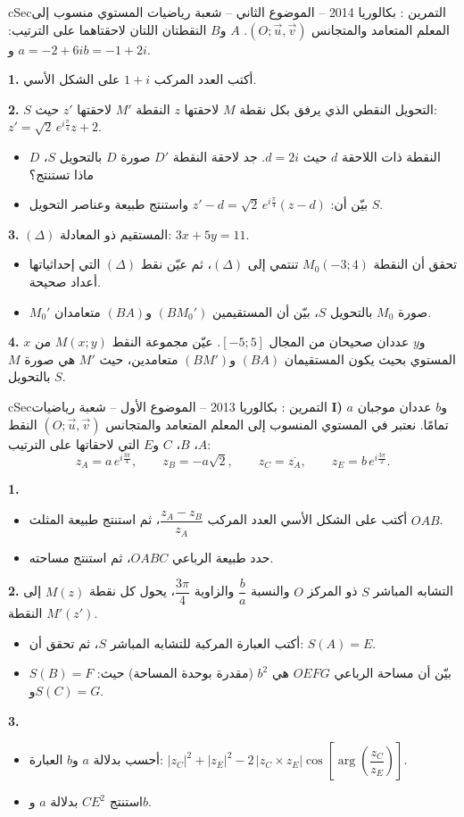 \documentclass[12pt,a4paper]{article}
\newenvironment{BOX}[2]{\begin{otherlanguage}{english}\begin{arbox}{#1}{#2}}{\end{arbox}\end{otherlanguage}}
\newcounter{exo}
\newenvironment{tamrin}[1]{\stepcounter{exo}\begin{BOX}{cSec}{التمرين \theexo: #1}}{\end{BOX}}
\newenvironment{sq}{\begin{itemize}[leftmargin=2.4em,itemsep=3pt]}{\end{itemize}}
\newcommand{\qa}{\item[(أ)]}\newcommand{\qb}{\item[(ب)]}\newcommand{\qc}{\item[(جـ)]}\newcommand{\qd}{\item[(د)]}\newcommand{\qe}{\item[(هـ)]}
\newcommand{\QQ}[1]{\par\smallskip\textbf{#1.} }
\begin{document}
\begin{tamrin}{بكالوريا 2014 -- الموضوع الثاني -- شعبة رياضيات}
المستوي منسوب إلى المعلم المتعامد والمتجانس $(O;\vec u,\vec v)$. $A$ و$B$ النقطتان اللتان لاحقتاهما على الترتيب: $a=-2+6i$ و$b=-1+2i$.
\QQ{1} أكتب العدد المركب $1+i$ على الشكل الأسي.
\QQ{2} $S$ التحويل النقطي الذي يرفق بكل نقطة $M$ لاحقتها $z$ النقطة $M'$ لاحقتها $z'$ حيث: $z'=\sqrt2\,e^{i\frac{\pi}{4}}z+2$.
\begin{sq}
\qa $D$ النقطة ذات اللاحقة $d$ حيث $d=2i$. جد لاحقة النقطة $D'$ صورة $D$ بالتحويل $S$، ماذا تستنتج؟
\qb بيّن أن: $z'-d=\sqrt2\,e^{i\frac{\pi}{4}}(z-d)$ واستنتج طبيعة وعناصر التحويل $S$.
\end{sq}
\QQ{3} $(\Delta)$ المستقيم ذو المعادلة: $3x+5y=11$.
\begin{sq}
\qa تحقق أن النقطة $M_0(-3;4)$ تنتمي إلى $(\Delta)$، ثم عيّن نقط $(\Delta)$ التي إحداثياتها أعداد صحيحة.
\qb $M_0'$ صورة $M_0$ بالتحويل $S$، بيّن أن المستقيمين $(BM_0')$ و$(BA)$ متعامدان.
\end{sq}
\QQ{4} $x$ و$y$ عددان صحيحان من المجال $[-5;5]$. عيّن مجموعة النقط $M(x;y)$ من المستوي بحيث يكون المستقيمان $(BA)$ و$(BM')$ متعامدين، حيث $M'$ هي صورة $M$ بالتحويل $S$.
\end{tamrin}

\begin{tamrin}{بكالوريا 2013 -- الموضوع الأول -- شعبة رياضيات}
\textbf{I)} $a$ و$b$ عددان موجبان تمامًا. نعتبر في المستوي المنسوب إلى المعلم المتعامد والمتجانس $(O;\vec u,\vec v)$ النقط $A$، $B$، $C$ و$E$ التي لاحقاتها على الترتيب:
\[z_A=a\,e^{i\frac{3\pi}{4}},\qquad z_B=-a\sqrt2,\qquad z_C=\overline{z_A},\qquad z_E=b\,e^{i\frac{3\pi}{2}}.\]
\QQ{1}
\begin{sq}
\qa أكتب على الشكل الأسي العدد المركب $\dfrac{z_A-z_B}{z_A}$، ثم استنتج طبيعة المثلث $OAB$.
\qb حدد طبيعة الرباعي $OABC$، ثم استنتج مساحته.
\end{sq}
\QQ{2} التشابه المباشر $S$ ذو المركز $O$ والنسبة $\dfrac{b}{a}$ والزاوية $\dfrac{3\pi}{4}$، يحول كل نقطة $M(z)$ إلى النقطة $M'(z')$.
\begin{sq}
\qa أكتب العبارة المركبة للتشابه المباشر $S$، ثم تحقق أن: $S(A)=E$.
\qb بيّن أن مساحة الرباعي $OEFG$ هي $b^2$ (مقدرة بوحدة المساحة) حيث: $S(B)=F$ و$S(C)=G$.
\end{sq}
\QQ{3}
\begin{sq}
\qa أحسب بدلالة $a$ و$b$ العبارة: $|z_C|^2+|z_E|^2-2\,|z_C\times z_E|\cos\left[\arg\left(\dfrac{z_C}{z_E}\right)\right]$.
\qb استنتج $CE^2$ بدلالة $a$ و$b$.
\end{sq}
\end{tamrin}
\end{document}

